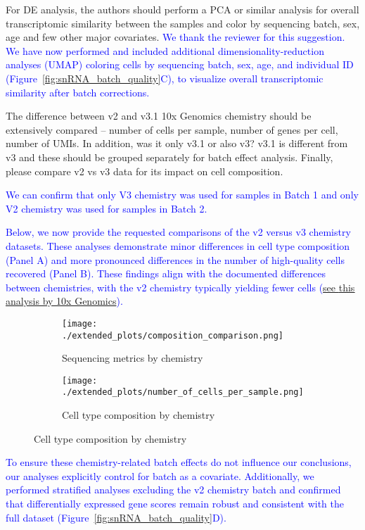 For DE analysis, the authors should perform a PCA or similar analysis for overall transcriptomic similarity between the samples and color by sequencing batch, sex, age and few other major covariates.
\textcolor{blue}{We thank the reviewer for this suggestion. We have now performed and included additional dimensionality-reduction analyses (UMAP) coloring cells by sequencing batch, sex, age, and individual ID (Figure~\ref{fig:snRNA_batch_quality}C), to visualize overall transcriptomic similarity after batch corrections.}

The difference between v2 and v3.1 10x Genomics chemistry should be extensively compared – number of cells per sample, number of genes per cell, number of UMIs. In addition, was it only v3.1 or also v3? v3.1 is different from v3 and these should be grouped separately for batch effect analysis. Finally, please compare v2 vs v3 data for its impact on cell composition.

\textcolor{blue}{We can confirm that only V3 chemistry was used for samples in Batch 1 and only V2 chemistry was used for samples in Batch 2.}

\textcolor{blue}{Below, we now provide the requested comparisons of the v2 versus v3 chemistry datasets. These analyses demonstrate minor differences in cell type composition (Panel A) and more pronounced differences in the number of high-quality cells recovered (Panel B). These findings align with the documented differences between chemistries, with the v2 chemistry typically yielding fewer cells (\href{https://kb.10xgenomics.com/hc/en-us/articles/360026501692-Do-we-see-a-difference-in-the-expression-profile-of-3-Single-Cell-v3-chemistry-compared-to-v2-chemistry}{see \underline{this analysis} by 10x Genomics}).}

\begin{figure}[H]
	\begin{subfigure}[t]{0.33\textwidth}
		\caption{Sequencing metrics by chemistry}
		\texttt{[image: ./extended\_plots/composition\_comparison.png]}        
	\end{subfigure} 
	\begin{subfigure}[t]{0.65\textwidth}
		\caption{Cell type composition by chemistry}
		\texttt{[image: ./extended\_plots/number\_of\_cells\_per\_sample.png]}        
	\end{subfigure} 
\end{figure}

\textcolor{blue}{To ensure these chemistry-related batch effects do not influence our conclusions, our analyses explicitly control for batch as a covariate. Additionally, we performed stratified analyses excluding the v2 chemistry batch and confirmed that differentially expressed gene scores remain robust and consistent with the full dataset (Figure~\ref{fig:snRNA_batch_quality}D).}

